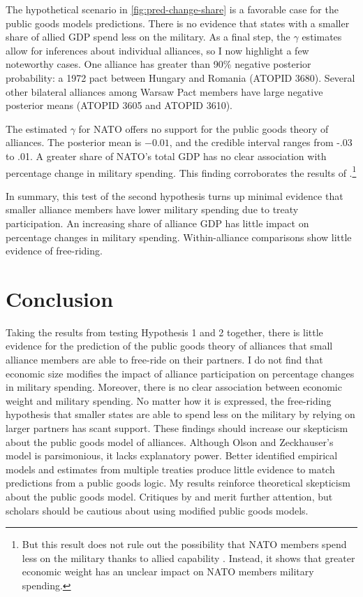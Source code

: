 \documentclass[12pt]{article}
\begin{document}
The hypothetical scenario in \autoref{fig:pred-change-share} is a favorable case for the public goods models predictions. 
There is no evidence that states with a smaller share of allied GDP spend less on the military. 
As a final step, the $\gamma$ estimates allow for inferences about individual alliances, so I now highlight a few noteworthy cases. 
One alliance has greater than 90\% negative posterior probability: a 1972 pact between Hungary and Romania (ATOPID 3680). 
Several other bilateral alliances among Warsaw Pact members have large negative posterior means (ATOPID 3605 and ATOPID 3610). 

 
The estimated $\gamma$ for NATO offers no support for the public goods theory of alliances. 
The posterior mean is $-0.01$, and the credible interval ranges from -.03 to .01.  
A greater share of NATO's total GDP has no clear association with percentage change in military spending. 
This finding corroborates the results of \citet{PluemperNeumayer2015}.\footnote{But this result does not rule out the possibility that NATO members spend less on the military thanks to allied capability \citep{GeorgeSandler2017}. Instead, it shows that greater economic weight has an unclear impact on NATO members military spending.}


In summary, this test of the second hypothesis turns up minimal evidence that smaller alliance members have lower military spending due to treaty participation. 
An increasing share of alliance GDP has little impact on percentage changes in military spending. 
Within-alliance comparisons show little evidence of free-riding.  


\section{Conclusion}

Taking the results from testing Hypothesis 1 and 2 together, there is little evidence for the prediction of the public goods theory of alliances that small alliance members are able to free-ride on their partners. 
I do not find that economic size modifies the impact of alliance participation on percentage changes in military spending.
Moreover, there is no clear association between economic weight and military spending. 
No matter how it is expressed, the free-riding hypothesis that smaller states are able to spend less on the military by relying on larger partners has scant support. 
These findings should increase our skepticism about the public goods model of alliances. 
Although Olson and Zeckhauser's model is parsimonious, it lacks explanatory power. 
Better identified empirical models and estimates from multiple treaties produce little evidence to match predictions from a public goods logic. 
My results reinforce theoretical skepticism about the public goods model. 
Critiques by \citet{Palmer1990} and \citet{SandlerHartley2001} merit further attention, but scholars should be cautious about using modified public goods models. 
\end{document}
